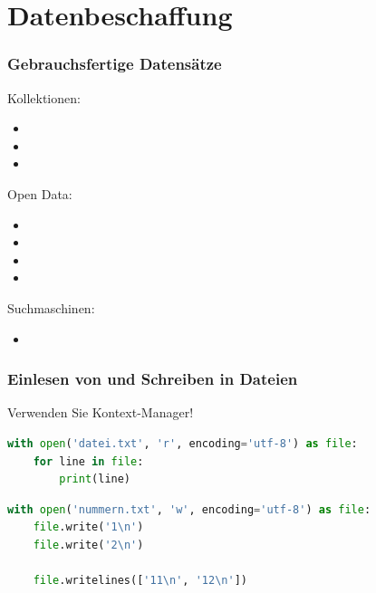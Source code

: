 \section{Datenbeschaffung}


\begin{frame}
	\frametitle{\glqq{}Gebrauchsfertige\grqq{} Datensätze}
	
	Kollektionen: \vspace{-.33\baselineskip}
	\begin{itemize}
		\item {}
		\item {}
		\item {}
	\end{itemize}
	
	Open Data: \vspace{-.33\baselineskip}
	\begin{itemize}
		\item {}
		\item {}
		\item {}
		\item {}
	\end{itemize}
	
	Suchmaschinen: \vspace{-.33\baselineskip}
	\begin{itemize}
		\item {}
	\end{itemize}
\end{frame}

\begin{frame}[fragile]
	\frametitle{Einlesen von und Schreiben in Dateien}
	
	Verwenden Sie Kontext-Manager!
	
	\begin{lstlisting}[language=Python]
with open('datei.txt', 'r', encoding='utf-8') as file:
    for line in file:
        print(line)\end{lstlisting}
    
	\begin{lstlisting}[language=Python]
with open('nummern.txt', 'w', encoding='utf-8') as file:
    file.write('1\n')
    file.write('2\n')

    file.writelines(['11\n', '12\n'])\end{lstlisting}
\end{frame}

